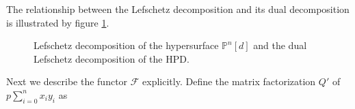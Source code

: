 \documentclass[a4paper,11pt]{article}
\numberwithin{equation}{section}
\begin{document}
The relationship between the Lefschetz decomposition and its dual decomposition 
is illustrated by figure \ref{HPDCI}.
\begin{figure}[!h]
 \centering
{}
    \caption{Lefschetz decomposition of the hypersurface $\mathbb{P}^n[d]$ and the dual Lefschetz decomposition of the HPD.}\label{HPDCI}
\end{figure}
Next we describe the functor $\mathcal{F}$ explicitly. Define the matrix 
factorization $Q'$ of $p \sum_{i=0}^n x_i y_i$ as
\end{document}
